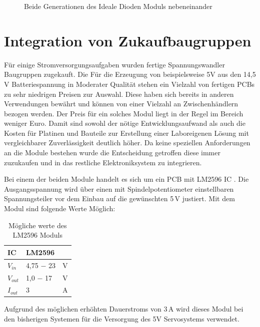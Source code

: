 \begin{figure}[H]
\centering
{}
\caption{Beide Generationen des Ideale Dioden Moduls nebeneinander} 
\label{fig:Beide Generationen des Ideale Dioden Moduls nebeneinander}
\end{figure}

\section{Integration von Zukaufbaugruppen}

Für einige Stromversorgungsaufgaben wurden fertige Spannungswandler Baugruppen zugekauft. Die Für die Erzeugung von beispielsweise 5V aus den 14,5 V Batteriespannung in Moderater Qualität stehen ein Vielzahl von fertigen PCBs zu sehr niedrigen Preisen zur Auswahl. 
Diese haben sich bereits in anderen Verwendungen bewährt und können von einer Vielzahl an Zwischenhändlern bezogen werden. Der Preis für ein solches Modul liegt in der Regel im Bereich weniger Euro. Damit sind sowohl der nötige Entwicklungsaufwand als auch die Kosten für Platinen und Bauteile zur Erstellung einer Laboreigenen Lösung mit vergleichbarer Zuverlässigkeit deutlich höher. Da keine speziellen Anforderungen an die Module bestehen wurde die Entscheidung getroffen diese immer zuzukaufen und in das restliche Elektroniksystem zu integrieren.

Bei einem der beiden Module handelt es sich um ein PCB mit LM2596 IC . 
Die Ausgangsspannung wird über einen mit Spindelpotentiometer einstellbaren Spannungsteiler vor dem Einbau auf die gewünschten 5\,V justiert.
Mit dem Modul sind folgende Werte Möglich:

\begin{table}[h]
\centering
\begin{tabular}{|l|l|l|}
\hline
IC    & LM2596    &   \\ \hline
$V_{in}$  & 4,75 $-$ 23 & V \\ \hline
$V_{out}$ & 1,0 $-$ 17  & V \\ \hline
$I_{out}$ & 3         & A \\ \hline
\end{tabular}
\caption{Mögliche werte des LM2596 Moduls}
\label{Mögliche werte des LM2596 Moduls}
\end{table}

Aufgrund des möglichen erhöhten Dauerstroms von 3\,A wird dieses Modul bei den bisherigen Systemen für die Versorgung des 5V Servosystems verwendet.

